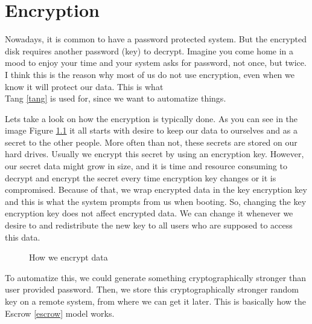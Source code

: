 \documentclass[../xdudla00-porting-Tang-to-Open-WRT.tex]{subfiles}
\begin{document}
\chapter{Encryption}\label{encryption}

Nowadays, it is common to have a password protected system.
But the encrypted disk requires another password (key) to decrypt.
Imagine you come home in a mood to enjoy your time and your system asks for password, not once, but twice.
I think this is the reason why most of us do not use encryption, even when we know it will protect our data.
This is what \\Tang \ref{tang} is used for, since we want to automatize things.

Lets take a look on how the encryption is typically done.
As you can see in the image Figure \ref{fig:encdata} it all starts with desire to keep our data to ourselves and as a secret to the other people.
More often than not, these secrets are stored on our hard drives.
Usually we encrypt this secret by using an encryption key.
However, our secret data might grow in size, and it is time and resource consuming to decrypt and encrypt the secret every time encryption key changes or it is compromised.
Because of that, we wrap encrypted data in the key encryption key and this is what the system prompts from us when booting.
So, changing the key encryption key does not affect encrypted data.
We can change it whenever we desire to and redistribute the new key to all users who are supposed to access this data.

\begin{figure}[h]
    \centering
    \caption{How we encrypt data}
    \label{fig:encdata}
\end{figure}

To automatize this, we could generate something cryptographically stronger than user provided password.
Then, we store this cryptographically stronger random key on a remote system, from where we can get it later.
This is basically how the Escrow \ref{escrow} model works.
\end{document}
